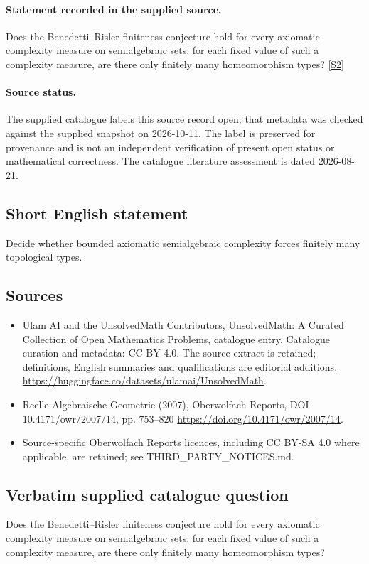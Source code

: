 \documentclass[11pt]{article}
\begin{document}
\paragraph{Statement recorded in the supplied source.}
Does the Benedetti–Risler finiteness conjecture hold for every axiomatic complexity measure on semialgebraic sets: for each fixed value of such a complexity measure, are there only finitely many homeomorphism types? \href{https://doi.org/10.4171/owr/2007/14}{[S2]}
\paragraph{Source status.}
The supplied catalogue labels this source record open; that metadata was checked against the supplied snapshot on 2026-10-11. The label is preserved for provenance and is not an independent verification of present open status or mathematical correctness. The catalogue literature assessment is dated 2026-08-21.
\subsection{Short English statement}
Decide whether bounded axiomatic semialgebraic complexity forces finitely many topological types.
\subsection{Sources}
\begin{itemize}
\item[S1] Ulam AI and the UnsolvedMath Contributors, UnsolvedMath: A Curated Collection of Open Mathematics Problems, catalogue entry. Catalogue curation and metadata: CC BY 4.0. The source extract is retained; definitions, English summaries and qualifications are editorial additions.
\url{https://huggingface.co/datasets/ulamai/UnsolvedMath}.
\item[S2] Reelle Algebraische Geometrie (2007), Oberwolfach Reports, DOI 10.4171/owr/2007/14, pp. 753--820
\url{https://doi.org/10.4171/owr/2007/14}.
\item Source-specific Oberwolfach Reports licences, including CC BY-SA 4.0 where applicable, are retained; see THIRD\_PARTY\_NOTICES.md.
\end{itemize}
\subsection{Verbatim supplied catalogue question}
Does the Benedetti–Risler finiteness conjecture hold for every axiomatic complexity measure on semialgebraic sets: for each fixed value of such a complexity measure, are there only finitely many homeomorphism types?
\end{document}
